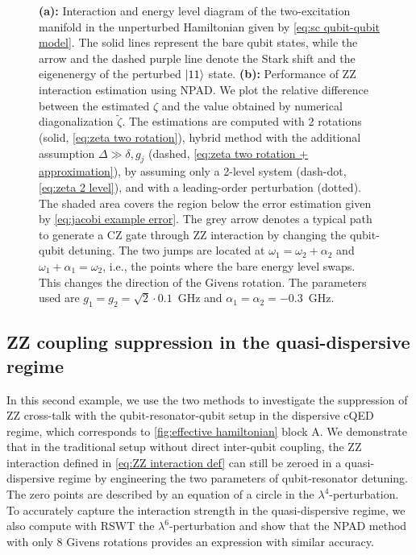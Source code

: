 \documentclass[%
 reprint,
 amsmath,amssymb,
 aps,
pra,
noeprint,
superscriptaddress,
]{revtex4-2}
\begin{document}
\begin{figure}
    \centering

    \caption{
    {\bf (a):} Interaction and energy level diagram of the two-excitation manifold in the unperturbed Hamiltonian given by \cref{eq:sc qubit-qubit model}.
    The solid lines represent the bare qubit states, while the arrow and the dashed purple line denote the Stark shift and the eigenenergy of the perturbed $\ket{11}$ state.
    {\bf (b):}
    Performance of ZZ interaction estimation using NPAD.
    We plot the relative difference between the estimated $\zeta$ and the value obtained by numerical diagonalization $\tilde{\zeta}$.
    The estimations are computed with 2 rotations (solid, \cref{eq:zeta two rotation}), hybrid method with the additional assumption $\Delta \gg \delta, g_j$ (dashed, \cref{eq:zeta two rotation + approximation}), by assuming only a 2-level system (dash-dot, \cref{eq:zeta 2 level}), and with a leading-order perturbation (dotted).
    The shaded area covers the region below the error estimation given by \cref{eq:jacobi example error}.
    The grey arrow denotes a typical path to generate a CZ gate through ZZ interaction by changing the qubit-qubit detuning.
    The two jumps are located at $\omega_1=\omega_2+\alpha_2$ and $\omega_1+\alpha_1=\omega_2$, i.e., the points where the bare energy level swaps.
    This changes the direction of the Givens rotation.
    The parameters used are $g_1=g_2=\sqrt{2}\cdot 0.1$~GHz and $\alpha_1=\alpha_2=-0.3$~GHz.
    }
\end{figure}



\subsection{ZZ coupling suppression in the quasi-dispersive regime}
\label{sec:application2}
In this second example, we use the two methods to investigate the suppression of ZZ cross-talk with the qubit-resonator-qubit setup in the dispersive cQED regime, which corresponds to \cref{fig:effective hamiltonian} block A.
We demonstrate that in the traditional setup without direct inter-qubit coupling, the ZZ interaction defined in \cref{eq:ZZ interaction def} can still be zeroed in a quasi-dispersive regime by engineering the two parameters of qubit-resonator detuning.
The zero points are described by an equation of a circle in the $\lambda^4$-perturbation.
To accurately capture the interaction strength in the quasi-dispersive regime, we also compute with RSWT the $\lambda^6$-perturbation and show that the NPAD method with only 8 Givens rotations provides an expression with similar accuracy.
\end{document}
